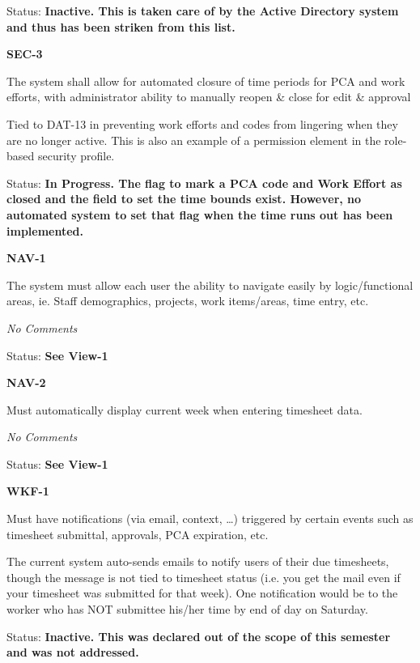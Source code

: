 \documentclass{article}
\begin{document}
\noindent Status: \textbf{Inactive.  This is taken care of by the Active Directory system and thus has been striken from this list.}

\noindent \textit{}


\noindent \textbf{SEC-3}

\noindent The system shall allow for automated closure of time periods for PCA and work efforts, with administrator ability to manually reopen \& close for edit \& approval

\noindent Tied to DAT-13 in preventing work efforts and codes from lingering when they are no longer active. This is also an example of a permission element in the role-based security profile.

\noindent Status: \textbf{In Progress.  The flag to mark a PCA code and Work Effort as closed and the field to set the time bounds exist.  However, no automated system to set that flag when the time runs out has been implemented.}

\noindent \textit{}


\noindent \textbf{NAV-1}

\noindent The system must allow each user the ability to navigate easily by logic/functional areas, ie. Staff demographics, projects, work items/areas, time entry, etc.

 \textit{No Comments}

Status: \textbf{See View-1}\textit{}

\noindent \textit{}


\noindent \textbf{NAV-2}

\noindent Must automatically display current week when entering timesheet data.

 \textit{No Comments }

\textit{ }Status: \textbf{See View-1}\textit{}

\noindent \textit{}


\noindent \textbf{WKF-1}

\noindent Must have notifications (via email, context, \dots ) triggered by certain events such as timesheet submittal, approvals, PCA expiration, etc.

\noindent The current system auto-sends emails to notify users of their due timesheets, though the message is not tied to timesheet status (i.e. you get the mail even if your timesheet was submitted for that week). One notification would be to the worker who has NOT submittee his/her time by end of day on Saturday.

\noindent Status: \textbf{Inactive.  This was declared out of the scope of this semester and was not addressed.}
\end{document}
